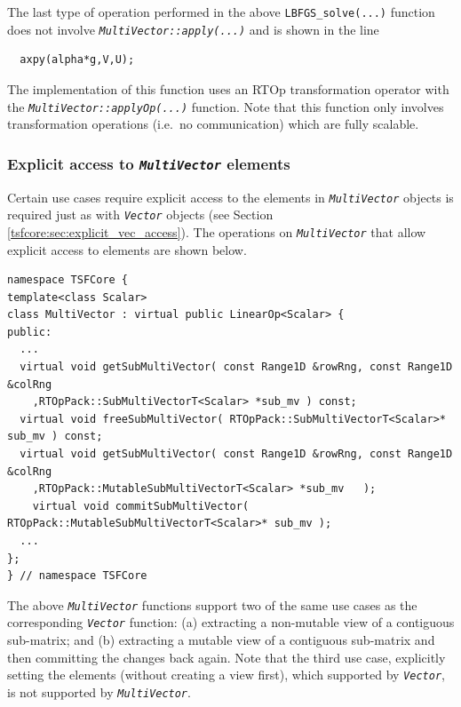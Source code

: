 The last type of operation performed in the above
{}\texttt{LBFGS\_solve(...)}  function does not involve
{}\texttt{\textit{Multi\-Vector\-::apply(\-...)}} and is shown in the
line

{\scriptsize\begin{verbatim}
  axpy(alpha*g,V,U);
\end{verbatim}}

{}\noindent{}The implementation of this function uses an RTOp
transformation operator with the
{}\texttt{\textit{Multi\-Vector\-::applyOp(\-...)}}  function.  Note
that this function only involves transformation operations (i.e.~no
communication) which are fully scalable.

%
\subsubsection{Explicit access to {}\texttt{\textit{Multi\-Vector}} elements}
\label{tsfcore:sec:explicit_multi_vec_access}
%

Certain use cases require explicit access to the elements in
{}\texttt{\textit{Multi\-Vector}} objects is required just as with
{}\texttt{\textit{Vector}} objects (see Section
{}\ref{tsfcore:sec:explicit_vec_access}).  The operations on
{}\texttt{\textit{Multi\-Vector}} that allow explicit access to
elements are shown below.

{\scriptsize\begin{verbatim}
namespace TSFCore {
template<class Scalar>
class MultiVector : virtual public LinearOp<Scalar> {
public:
  ...
  virtual void getSubMultiVector( const Range1D &rowRng, const Range1D &colRng
    ,RTOpPack::SubMultiVectorT<Scalar> *sub_mv ) const;
  virtual void freeSubMultiVector( RTOpPack::SubMultiVectorT<Scalar>* sub_mv ) const;
  virtual void getSubMultiVector( const Range1D &rowRng, const Range1D &colRng
    ,RTOpPack::MutableSubMultiVectorT<Scalar> *sub_mv	);
	virtual void commitSubMultiVector( RTOpPack::MutableSubMultiVectorT<Scalar>* sub_mv );
  ...
};
} // namespace TSFCore
\end{verbatim}}

The above {}\texttt{\textit{Multi\-Vector}} functions support two of the
same use cases as the corresponding {}\texttt{\textit{Vector}}
function: (a) extracting a non-mutable view of a contiguous sub-matrix;
and (b) extracting a mutable view of a contiguous sub-matrix and then
committing the changes back again.  Note that the third use case,
explicitly setting the elements (without creating a view first), which
supported by {}\texttt{\textit{Vector}}, is not supported by
{}\texttt{\textit{Multi\-Vector}}.

